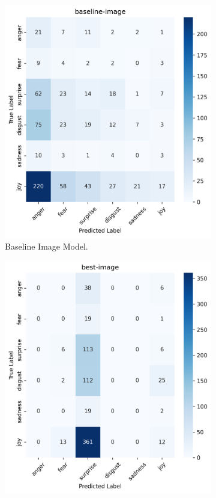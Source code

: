 \begin{figure}[h]
    \centering
    \begin{subfigure}[b]{0.48\textwidth}
        \includegraphics[width=\textwidth]{images/confusion_matrix_baseline_image_dist.png}
        \caption{Baseline Image Model.}
        \label{fig:image-confusion-baseline}
    \end{subfigure}
    \hfill
    \begin{subfigure}[b]{0.48\textwidth}
        \includegraphics[width=\textwidth]{images/confusion_matrix_best_image_dist.png}

\end{subfigure}
\end{figure}
